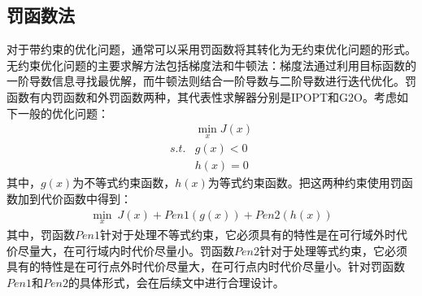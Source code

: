 \documentclass[master,academic]{ysuthesis} %
\begin{document}
		\subsection{罚函数法}
		对于带约束的优化问题，通常可以采用罚函数将其转化为无约束优化问题的形式。无约束优化问题的主要求解方法包括梯度法和牛顿法：梯度法通过利用目标函数的一阶导数信息寻找最优解，而牛顿法则结合一阶导数与二阶导数进行迭代优化。罚函数有内罚函数和外罚函数两种，其代表性求解器分别是IPOPT和G2O。考虑如下一般的优化问题：
		\begin{equation}
			\begin{aligned}
				&\min_{x} J(x)\\
					s.t. &g(x)<0\\
					&h(x)=0
			\end{aligned}
			\label{优化问题}
		\end{equation}
		其中，$g(x)$为不等式约束函数，$h(x)$为等式约束函数。把这两种约束使用罚函数加到代价函数中得到：
		\begin{equation}
			\begin{aligned}
				\min_{x} \ J(x)+Pen1(g(x))+Pen2(h(x))
			\end{aligned}
		\end{equation}
		其中，罚函数$Pen1$针对于处理不等式约束，它必须具有的特性是在可行域外时代价尽量大，在可行域内时代价尽量小。罚函数$Pen2$针对于处理等式约束，它必须具有的特性是在可行点外时代价尽量大，在可行点内时代价尽量小。针对罚函数$Pen1$和$Pen2$的具体形式，会在后续文中进行合理设计。
\end{document}
